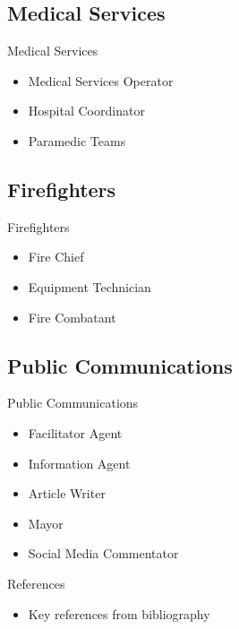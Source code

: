 \documentclass{beamer}
\begin{document}
\subsection{Medical Services}
\begin{frame}{Medical Services}
    \begin{itemize}
        \item Medical Services Operator
        \item Hospital Coordinator
        \item Paramedic Teams
    \end{itemize}
\end{frame}

\subsection{Firefighters}
\begin{frame}{Firefighters}
    \begin{itemize}
        \item Fire Chief
        \item Equipment Technician
        \item Fire Combatant
    \end{itemize}
\end{frame}

\subsection{Public Communications}
\begin{frame}{Public Communications}
    \begin{itemize}
        \item Facilitator Agent
        \item Information Agent
        \item Article Writer
        \item Mayor
        \item Social Media Commentator
    \end{itemize}
\end{frame}

\begin{frame}{References}
    \begin{itemize}
        \item Key references from bibliography
    \end{itemize}
\end{frame}
\end{document}
